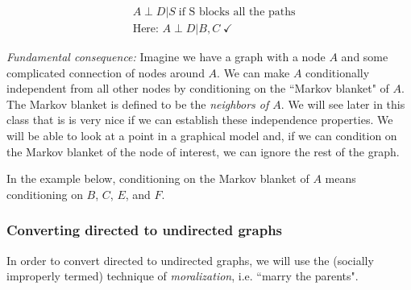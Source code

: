 \documentclass{article}
\begin{document}
\begin{align}
&A \perp D|S \; \text{if S blocks all the paths} \\
&\text{Here: } A \perp D|B,C \; \checkmark
\end{align}

\emph{Fundamental consequence:} Imagine we have a graph with a node $A$ and some complicated connection of nodes around $A$. 
We can make $A$ conditionally independent from all other nodes by conditioning on the ``Markov blanket" of $A$.
The Markov blanket is defined to be the \emph{neighbors of $A$}.
We will see later in this class that is is very nice if we can establish these independence properties.
We will be able to look at a point in a graphical model and, if we can condition on the Markov blanket of the node of interest, we can ignore the rest of the graph.
\smallskip

In the example below, conditioning on the Markov blanket of $A$ means conditioning on $B$, $C$, $E$, and $F$.

\begin{center}
\end{center}


\subsubsection{Converting directed to undirected graphs}

In order to convert directed to undirected graphs, we will use the (socially improperly termed) technique of \textit{moralization}, i.e. ``marry the parents".
\smallskip
\end{document}
